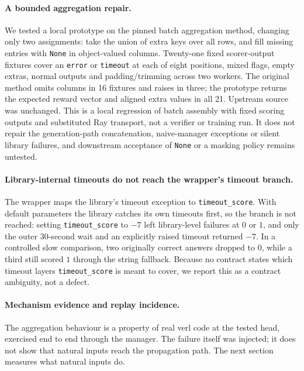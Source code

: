 \documentclass[10pt,a4paper]{article}
\begin{document}
\paragraph{A bounded aggregation repair.}
We tested a local prototype on the pinned batch aggregation method, changing
only two assignments: take the union of extra keys over all rows, and fill
missing entries with \texttt{None} in object-valued columns. Twenty-one
fixed scorer-output fixtures cover an \texttt{error} or \texttt{timeout}
at each of eight positions, mixed flags, empty extras, normal outputs and
padding/trimming across two workers. The original method omits columns in
16 fixtures and raises in three; the prototype returns the expected reward
vector and aligned extra values in all 21. Upstream source was unchanged.
This is a local regression of batch assembly with fixed scoring outputs and
substituted Ray transport, not a verifier or training run. It does not repair
the generation-path concatenation, naive-manager exceptions or silent
library failures, and downstream acceptance of \texttt{None} or a masking
policy remains untested.

\paragraph{Library-internal timeouts do not reach the wrapper's timeout branch.}
The wrapper maps the library's timeout exception to \texttt{timeout\_score}.
With default parameters the library catches its own timeouts first, so the
branch is not reached: setting \texttt{timeout\_score} to $-7$ left
library-level failures at $0$ or $1$, and only the outer 30-second wait and an
explicitly raised timeout returned $-7$. In a controlled slow comparison, two
originally correct answers dropped to $0$, while a third still scored $1$
through the string fallback. Because no contract states which timeout layers
\texttt{timeout\_score} is meant to cover, we report this as a contract
ambiguity, not a defect.

\paragraph{Mechanism evidence and replay incidence.}
The aggregation behaviour is a property of real verl code at the tested head,
exercised end to end through the manager. The failure itself was injected; it
does not show that natural inputs reach the propagation path. The next
section measures what natural inputs do.

\end{document}
